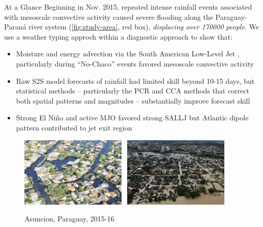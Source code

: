 \begin{block}{At a Glance}
  Beginning in Nov. 2015, repeated intense rainfall events associated with mesoscale convective activity caused severe flooding along the Paraguay-Paran\'{a} river system (\cref{fig:study-area}, red box), \emph{displacing over 170000 people}.
  We use a weather typing approch within a diagnostic approach to show that:
  \begin{itemize}
    \item Moisture and energy advection via the South American Low-Level Jet \cite{Marengo:2012cm}, particularly during ``No-Chaco'' events \cite{Vera:2006ib} favored mesoscale convective activity
    \item Raw S2S model forecasts of rainfall had limited skill beyond 10-15 days, but statistical methods -- particularly the PCR and CCA methods that correct both spatial patterns and magnitudes -- substantially improve forecast skill
    \item Strong El Ni\~{n}o and active MJO favored strong SALLJ but Atlantic dipole pattern contributed to jet exit region
  \end{itemize}
  \begin{mdframed}
  \begin{figure}
  	\noindent\includegraphics[width=0.45\textwidth]{asuncion-inundaciones.jpg}~
    \noindent\includegraphics[width=0.45\textwidth]{rio-py-banados.jpg}
  	\caption{
  		Asuncion, Paraguay, 2015-16
  	}
    \label{fig:floods}
  \end{figure}
  \end{mdframed}
\end{block}
